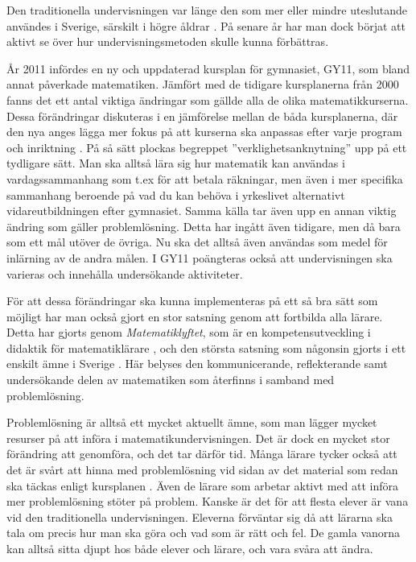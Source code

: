 
\textcolor{lila}{Den traditionella undervisningen var länge den som mer eller mindre uteslutande användes i Sverige, särskilt i högre åldrar \cite{Namnaren}. På senare år har man dock börjat att aktivt se över hur undervisningsmetoden skulle kunna förbättras.}

\textcolor{lila}{År 2011 infördes en ny och uppdaterad kursplan för gymnasiet, GY11, som bland annat påverkade matematiken. Jämfört med de tidigare kursplanerna från 2000 fanns det ett antal viktiga ändringar som gällde alla de olika matematikkurserna. 
Dessa förändringar diskuteras i en jämförelse mellan de båda kursplanerna, där den nya anges lägga mer fokus på att kurserna ska anpassas efter varje program och inriktning \cite{GY00-GY11}. På så sätt plockas begreppet ''verklighetsanknytning'' upp på ett tydligare sätt. Man ska alltså lära sig hur matematik kan användas i vardagssammanhang som t.ex för att betala räkningar, men även i mer specifika sammanhang beroende på vad du kan behöva i yrkeslivet alternativt vidareutbildningen efter gymnasiet. 
Samma källa tar även upp en annan viktig ändring som gäller problemlösning. Detta har ingått även tidigare, men då bara som ett mål utöver de övriga. Nu ska det alltså även användas som medel för inlärning av de andra målen. I GY11 poängteras också att undervisningen ska varieras och innehålla undersökande aktiviteter.}

\textcolor{lila}{För att dessa förändringar ska kunna implementeras på ett så bra sätt som möjligt har man också gjort en stor satsning genom att fortbilda alla lärare. Detta har gjorts genom \textsl{Matematiklyftet}, som är en kompetensutveckling i didaktik för matematiklärare \cite{Namnaren}, och den största satsning som någonsin gjorts i ett enskilt ämne i Sverige \cite{mattelyftet}. Här belyses den kommunicerande, reflekterande samt undersökande delen av matematiken som återfinns i samband med problemlösning.}
            
\textcolor{lila}{Problemlösning är alltså ett mycket aktuellt ämne, som man lägger mycket resurser på att införa i matematikundervisningen. Det är dock en mycket stor förändring att genomföra, och det tar därför tid. Många lärare tycker också att det är svårt att hinna med problemlösning vid sidan av det material som redan ska täckas enligt kursplanen \cite{2016Senare}. Även de lärare som arbetar aktivt med att införa mer problemlösning stöter på problem. Kanske är det för att flesta elever är vana vid den traditionella undervisningen. Eleverna förväntar sig då att lärarna ska tala om precis hur man ska göra och vad som är rätt och fel. De gamla vanorna kan alltså sitta djupt hos både elever och lärare, och vara svåra att ändra.}

